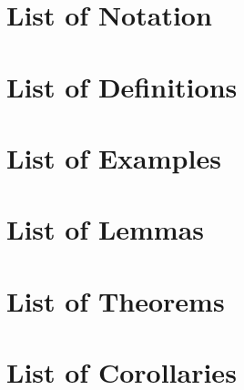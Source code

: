 
\section{List of Notation}

\section{List of Definitions}

\section{List of Examples}

\section{List of Lemmas}

\section{List of Theorems}

\section{List of Corollaries}

